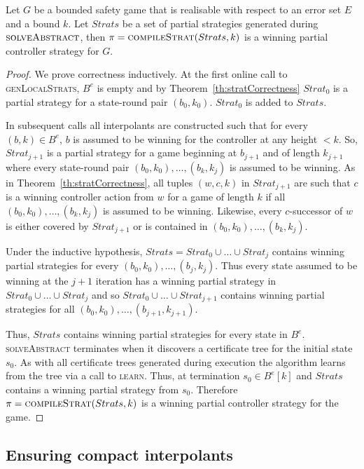 \begin{theorem}
    Let $G$ be a bounded safety game that is realisable with respect to an error set $E$ and a bound $k$. Let $Strats$ be a set of partial strategies generated during $\textsc{solveAbstract}$, then $\pi = \textsc{compileStrat}(Strats, k)$ is a winning partial controller strategy for $G$.
\end{theorem}
\begin{proof}
    We prove correctness inductively. At the first online call to \textsc{genLocalStrats}, $B^e$ is empty and by Theorem~\ref{th:stratCorrectness} $Strat_0$ is a partial strategy for a state-round pair $(b_0, k_0)$. $Strat_0$ is added to $Strats$.
    
    In subsequent calls all interpolants are constructed such that for every $(b, k) \in B^e$, $b$ is assumed to be winning for the controller at any height $<k$. So, $Strat_{j+1}$ is a partial strategy for a game beginning at $b_{j+1}$ and of length $k_{j+1}$ where every state-round pair $(b_0, k_0), \ldots, (b_k, k_j)$ is assumed to be winning. As in Theorem~\ref{th:stratCorrectness}, all tuples $(w, c, k)$ in $Strat_{j+1}$ are such that $c$ is a winning controller action from $w$ for a game of length $k$ if all $(b_0, k_0), \ldots, (b_k, k_j)$ is assumed to be winning. Likewise, every $c$-successor of $w$ is either covered by $Strat_{j+1}$ or is contained in $(b_0, k_0), \ldots, (b_k, k_j)$.

    Under the inductive hypothesis, $Strats = Strat_0 \cup \ldots \cup Strat_j$ contains winning partial strategies for every $(b_0, k_0), \ldots, (b_j, k_j)$. Thus every state assumed to be winning at the $j+1$ iteration has a winning partial strategy in $Strat_0 \cup \ldots \cup Strat_j$ and so $Strat_0 \cup \ldots \cup Strat_{j+1}$ contains winning partial strategies for all $(b_0, k_0), \ldots, (b_{j+1}, k_{j+1})$.

    Thus, $Strats$ contains winning partial strategies for every state in $B^e$.  \textsc{solveAbstract} terminates when it discovers a certificate tree for the initial state $s_0$. As with all certificate trees generated during execution the algorithm learns from the tree via a call to \textsc{learn}. Thus, at termination $s_0 \in B^e[k]$ and $Strats$ contains a winning partial strategy from $s_0$. Therefore $\pi = \textsc{compileStrat}(Strats, k)$ is a winning partial controller strategy for the game.
\end{proof}

\subsection{Ensuring compact interpolants}

